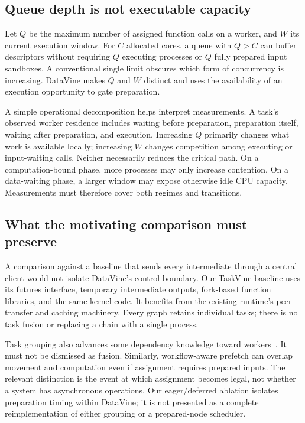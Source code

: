 \subsection{Queue depth is not executable capacity}
Let $Q$ be the maximum number of assigned function calls on a worker, and $W$
its current execution window. For $C$ allocated cores, a queue with $Q>C$
can buffer descriptors without requiring $Q$ executing processes or $Q$ fully
prepared input sandboxes. A conventional single limit obscures which form of
concurrency is increasing. DataVine makes $Q$ and $W$ distinct and uses the
availability of an execution opportunity to gate preparation.

A simple operational decomposition helps interpret measurements. A task's
observed worker residence includes waiting before preparation, preparation
itself, waiting after preparation, and execution. Increasing $Q$ primarily
changes what work is available locally; increasing $W$ changes competition
among executing or input-waiting calls. Neither necessarily reduces the
critical path. On a computation-bound phase, more processes may only increase
contention. On a data-waiting phase, a larger window may expose otherwise idle
CPU capacity. Measurements must therefore cover both regimes and transitions.

\subsection{What the motivating comparison must preserve}
A comparison against a baseline that sends every intermediate through a central
client would not isolate DataVine's control boundary. Our TaskVine baseline uses
its futures interface, temporary intermediate outputs, fork-based function
libraries, and the same kernel code. It benefits from the existing runtime's
peer-transfer and caching machinery. Every graph retains individual tasks;
there is no task fusion or replacing a chain with a single process.

Task grouping also advances some dependency knowledge toward workers~\cite{grouping}.
It must not be dismissed as fusion. Similarly, workflow-aware prefetch can
overlap movement and computation even if assignment requires prepared inputs.
The relevant distinction is the event at which assignment becomes legal, not
whether a system has asynchronous operations. Our eager/deferred ablation
isolates preparation timing within DataVine; it is not presented as a complete
reimplementation of either grouping or a prepared-node scheduler.
